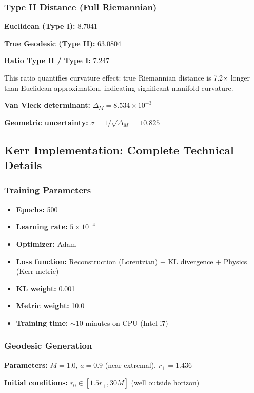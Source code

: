 \documentclass[11pt,a4paper]{article}
\begin{document}
\subsubsection{Type II Distance (Full Riemannian)}

\textbf{Euclidean (Type I):} 8.7041

\textbf{True Geodesic (Type II):} 63.0804

\textbf{Ratio Type II / Type I:} 7.247

This ratio quantifies curvature effect: true Riemannian distance is 7.2$\times$ longer than Euclidean approximation, indicating significant manifold curvature.

\textbf{Van Vleck determinant:} $\Delta_M = 8.534 \times 10^{-3}$

\textbf{Geometric uncertainty:} $\sigma = 1/\sqrt{\Delta_M} = 10.825$

\subsection{Kerr Implementation: Complete Technical Details}

\subsubsection{Training Parameters}

\begin{itemize}
\item \textbf{Epochs:} 500
\item \textbf{Learning rate:} $5 \times 10^{-4}$
\item \textbf{Optimizer:} Adam
\item \textbf{Loss function:} Reconstruction (Lorentzian) + KL divergence + Physics (Kerr metric)
\item \textbf{KL weight:} 0.001
\item \textbf{Metric weight:} 10.0
\item \textbf{Training time:} $\sim$10 minutes on CPU (Intel i7)
\end{itemize}

\subsubsection{Geodesic Generation}

\textbf{Parameters:} $M = 1.0$, $a = 0.9$ (near-extremal), $r_+ = 1.436$

\textbf{Initial conditions:} $r_0 \in [1.5r_+, 30M]$ (well outside horizon)
\end{document}
